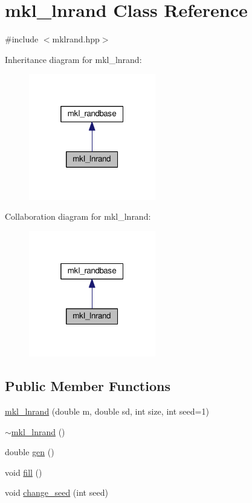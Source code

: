 \hypertarget{classmkl__lnrand}{}\section{mkl\+\_\+lnrand Class Reference}
\label{classmkl__lnrand}


{\ttfamily \#include $<$mklrand.\+hpp$>$}



Inheritance diagram for mkl\+\_\+lnrand\+:
\nopagebreak
\begin{figure}[H]
\begin{center}
\leavevmode
\includegraphics[width=157pt]{d0/df6/classmkl__lnrand__inherit__graph}
\end{center}
\end{figure}


Collaboration diagram for mkl\+\_\+lnrand\+:
\nopagebreak
\begin{figure}[H]
\begin{center}
\leavevmode
\includegraphics[width=157pt]{d0/dfe/classmkl__lnrand__coll__graph}
\end{center}
\end{figure}
\subsection*{Public Member Functions}
\begin{DoxyCompactItemize}
\item 
\hyperlink{classmkl__lnrand_a157affc091d0a00ab19edaeae727968d}{mkl\+\_\+lnrand} (double m, double sd, int size, int seed=1)
\item 
\hyperlink{classmkl__lnrand_a7d5bb29ce8f39e37d7f56049c8c381b6}{$\sim$mkl\+\_\+lnrand} ()
\item 
double \hyperlink{classmkl__lnrand_a30bf120ea39eb0fb5e99a9eecf5f8dbe}{gen} ()
\item 
void \hyperlink{classmkl__lnrand_a299d1067f9140cf9b0030e9d86b0e4f7}{fill} ()
\item 
void \hyperlink{classmkl__lnrand_a3585aa43dc16394654a35e12ad3196b3}{change\+\_\+seed} (int seed)
\end{DoxyCompactItemize}
